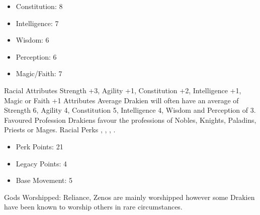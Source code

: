\documentclass[12pt]{article}
\begin{document}
\begin{multicols}{2}
\begin{itemize}
\item Constitution: 8
\item Intelligence: 7
\item Wisdom: 6
\item Perception: 6
\item Magic/Faith: 7
\end{itemize}
Racial Attributes
Strength +3, Agility +1, Constitution +2, Intelligence +1, Magic or Faith +1
Attributes Average
Drakien will often have an average of Strength 6, Agility 4, Constitution 5, Intelligence 4, Wisdom and Perception of 3.
Favoured Profession
Drakiens favour the professions of Nobles, Knights, Paladins, Priests or Mages.
Racial Perks
, , , .
\begin{itemize}
\item Perk Points: 21
\item Legacy Points: 4
\item Base Movement: 5
\end{itemize}
Gods Worshipped: Reliance, Zenos are mainly worshipped however some Drakien have been known to worship others in rare circumstances.
\end{multicols}
\newpage
\end{document}
